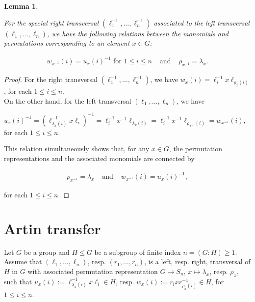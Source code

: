 \documentclass{amsart}
\newtheorem{lemma}{Lemma}[section]
\theoremstyle{definition}
\numberwithin{equation}{section}
\begin{document}
\begin{lemma}
\label{lem:PermRepr}

For the special right transversal \((\ell_1^{-1},\ldots,\ell_n^{-1})\)
associated to the left transversal \((\ell_1,\ldots,\ell_n)\),
we have the following relations between
the monomials and permutations corresponding to an element \(x\in G\):

\begin{equation}
\label{eqn:PermRepr}
\begin{array}{ccc}
w_{x^{-1}}(i)=u_x(i)^{-1} \text{ for } 1\le i\le n & \text{ and } & \rho_{x^{-1}}=\lambda_x.
\end{array}
\end{equation}

\end{lemma}


\begin{proof}
For the right transversal \((\ell_1^{-1},\ldots,\ell_n^{-1})\), we have
\(w_x(i)=\ell_i^{-1}x\ell_{\rho_x(i)}\), for each \(1\le i\le n\).\\
On the other hand,
for the left transversal \((\ell_1,\ldots,\ell_n)\), we have

\begin{center}
\(u_x(i)^{-1}=(\ell_{\lambda_x(i)}^{-1}x\ell_i)^{-1}=\ell_i^{-1}x^{-1}\ell_{\lambda_x(i)}
=\ell_i^{-1}x^{-1}\ell_{\rho_{x^{-1}}(i)}=w_{x^{-1}}(i)\),
for each \(1\le i\le n\).
\end{center}

\noindent
This relation simultaneously shows that, for any \(x\in G\),
the permutation representations and the associated monomials are connected by

\begin{equation*}
\begin{array}{ccc}
\rho_{x^{-1}}=\lambda_x & \text{ and } & w_{x^{-1}}(i)=u_x(i)^{-1},
\end{array}
\end{equation*}

\noindent
for each \(1\le i\le n\).
\end{proof}



\section{Artin transfer}
\label{s:ArtinTransfer}

Let \(G\) be a group and \(H\le G\) be a subgroup of finite index \(n=(G:H)\ge 1\).
Assume that \((\ell_1,\ldots,\ell_n)\), resp. \((r_1,\ldots,r_n)\),
is a left, resp. right, transversal of \(H\) in \(G\)
with associated permutation representation \(G\to S_n\),
\(x\mapsto\lambda_x\), resp. \(\rho_x\), such that
\(u_x(i):=\ell_{\lambda_x(i)}^{-1}x\ell_i\in H\), resp. \(w_x(i):=r_ixr_{\rho_x(i)}^{-1}\in H\),
for \(1\le i\le n\).
\end{document}
